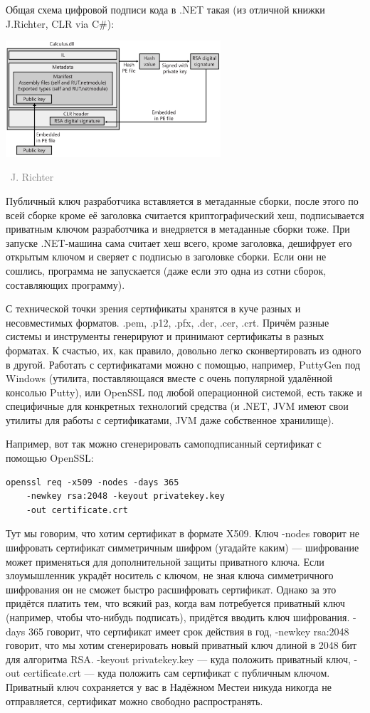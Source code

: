 \documentclass[a5paper]{article}
\newcommand{\attribution}[1] {
\vspace{-5mm}\begin{flushright}\begin{scriptsize}\textcolor{gray}{\textcopyright\, #1}\end{scriptsize}\end{flushright}
}
\begin{document}
Общая схема цифровой подписи кода в .NET такая (из отличной книжки J.Richter, CLR via C\#):

\begin{center}
    \includegraphics[width=0.6\textwidth]{dotNetCodeSigning.png}
    \attribution{J. Richter}
\end{center}

Публичный ключ разработчика вставляется в метаданные сборки, после этого по всей сборке кроме её заголовка считается криптографический хеш, подписывается приватным ключом разработчика и внедряется в метаданные сборки тоже. При запуске .NET-машина сама считает хеш всего, кроме заголовка, дешифрует его открытым ключом и сверяет с подписью в заголовке сборки. Если они не сошлись, программа не запускается (даже если это одна из сотни сборок, составляющих программу).

С технической точки зрения сертификаты хранятся в куче разных и несовместимых форматов. .pem, .p12, .pfx, .der, .cer, .crt. Причём разные системы и инструменты генерируют и принимают сертификаты в разных форматах. К счастью, их, как правило, довольно легко сконвертировать из одного в другой. Работать с сертификатами можно с помощью, например, PuttyGen под Windows (утилита, поставляющаяся вместе с очень популярной удалённой консолью Putty), или OpenSSL под любой операционной системой, есть также и специфичные для конкретных технологий средства (и .NET, JVM имеют свои утилиты для работы с сертификатами, JVM даже собственное хранилище).

Например, вот так можно сгенерировать самоподписанный сертификат с помощью OpenSSL:

\begin{verbatim}
openssl req -x509 -nodes -days 365 
    -newkey rsa:2048 -keyout privatekey.key 
    -out certificate.crt
\end{verbatim}

Тут мы говорим, что хотим сертификат в формате X509. Ключ -nodes говорит не шифровать сертификат симметричным шифром (угадайте каким) --- шифрование может применяться для дополнительной защиты приватного ключа. Если злоумышленник украдёт носитель с ключом, не зная ключа симметричного шифрования он не сможет быстро расшифровать сертификат. Однако за это придётся платить тем, что всякий раз, когда вам потребуется приватный ключ (например, чтобы что-нибудь подписать), придётся вводить ключ шифрования. -days 365 говорит, что сертификат имеет срок действия в год, -newkey rsa:2048 говорит, что мы хотим сгенерировать новый приватный ключ длиной в 2048 бит для алгоритма RSA. -keyout privatekey.key --- куда положить приватный ключ, -out certificate.crt --- куда положить сам сертификат с публичным ключом. Приватный ключ сохраняется у вас в Надёжном Месте\texttrademark и никуда никогда не отправляется, сертификат можно свободно распространять.
\end{document}
